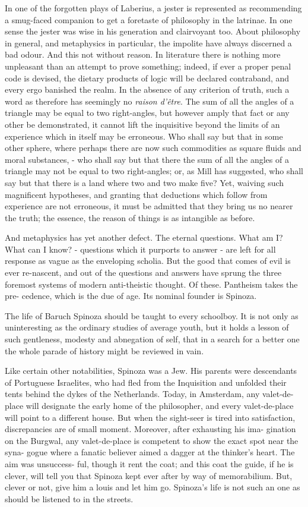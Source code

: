 \documentclass[]{book}
\begin{document}
In one of the forgotten plays of Laberius, a jester is represented as
recommending a smug-faced companion to get a foretaste of philosophy in
the latrinae. In one sense the jester was wise in his generation and
clairvoyant too. About philosophy in general, and metaphysics in
particular, the impolite have always discerned a bad odour. And this not
without reason. In literature there is nothing more unpleasant than an
attempt to prove something; indeed, if ever a proper penal code is
devised, the dietary products of logic will be declared contraband, and
every ergo banished the realm. In the absence of any criterion of truth,
such a word as therefore has seemingly no \emph{raison d'être}. The sum
of all the angles of a triangle may be equal to two right-angles, but
however amply that fact or any other be demonstrated, it cannot lift the
inquisitive beyond the limits of an experience which in itself may be
erroneous. Who shall say but that in some other sphere, where perhaps
there are now such commodities as square fluids and moral substances, -
who shall say but that there the sum of all the angles of a triangle may
not be equal to two right-angles; or, as Mill has suggested, who shall
say but that there is a land where two and two make five? Yet, waiving
such magnificent hypotheses, and granting that deductions which follow
from experience are not erroneous, it must be admitted that they bring
us no nearer the truth; the essence, the reason of things is as
intangible as before.

And metaphysics has yet another defect. The eternal questions. What am
I? What can I know? - questions which it purports to answer - are left
for all response as vague as the enveloping scholia. But the good that
comes of evil is ever re-nascent, and out of the questions and answers
have sprung the three foremost systems of modern anti-theistic thought.
Of these. Pantheism takes the pre- cedence, which is the due of age. Its
nominal founder is Spinoza.

The life of Baruch Spinoza should be taught to every schoolboy. It is
not only as uninteresting as the ordinary studies of average youth, but
it holds a lesson of such gentleness, modesty and abnegation of self,
that in a search for a better one the whole parade of history might be
reviewed in vain.

Like certain other notabilities, Spinoza was a Jew. His parents were
descendants of Portuguese Israelites, who had fled from the Inquisition
and unfolded their tents behind the dykes of the Netherlands. Today, in
Amsterdam, any valet-de-place will designate the early home of the
philosopher, and every valet-de-place will point to a different house.
But when the sight-seer is tired into satisfaction, discrepancies are of
small moment. Moreover, after exhausting his ima- gination on the
Burgwal, any valet-de-place is competent to show the exact spot near the
syna- gogue where a fanatic believer aimed a dagger at the thinker's
heart. The aim was unsuccess- ful, though it rent the coat; and this
coat the guide, if he is clever, will tell you that Spinoza kept ever
after by way of memorabilium. But, clever or not, give him a louis and
let him go. Spinoza's life is not such an one as should be listened to
in the streets.
\end{document}
